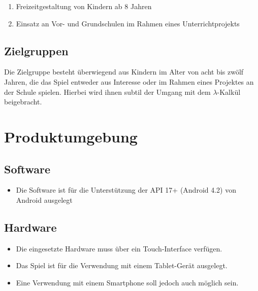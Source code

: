 \documentclass{scrartcl}
\begin{document}
\begin{enumerate}
	\item Freizeitgestaltung von Kindern ab 8 Jahren
	\item Einsatz an Vor- und Grundschulen im Rahmen eines Unterrichtprojekts
\end{enumerate}

\subsection{Zielgruppen}

Die Zielgruppe besteht überwiegend aus Kindern im Alter von acht bis zwölf Jahren, die das Spiel entweder aus Interesse oder im Rahmen eines Projektes an der Schule spielen. Hierbei wird ihnen subtil der Umgang mit dem $\lambda$-Kalkül beigebracht.

\clearpage








\section{Produktumgebung}

\subsection{Software}

\begin{itemize}
	\item Die Software ist für die Unterstützung der API 17+ (Android 4.2) von Android ausgelegt
\end{itemize}

\subsection{Hardware}

\begin{itemize}
	\item Die eingesetzte Hardware muss über ein Touch-Interface verfügen.
	\item Das Spiel ist für die Verwendung mit einem Tablet-Gerät ausgelegt.
	\item Eine Verwendung mit einem Smartphone soll jedoch auch möglich sein.
\end{itemize}

\clearpage
\end{document}

